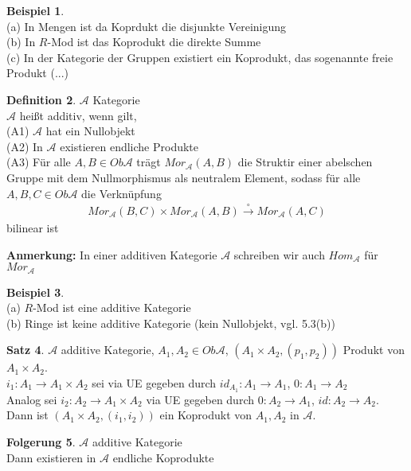 \documentclass[10pt,a4paper,numbers=endperiod]{scrreprt}
\theoremstyle{definition}
\newtheorem{satz}{Satz}[section]
\newtheorem{defi}[satz]{Definition}
\newtheorem{bsp}[satz]{Beispiel}
\newtheorem{folg}[satz]{Folgerung}
\begin{document}
\begin{bsp}
	$ $\\
	(a) In Mengen ist da Koprdukt die disjunkte Vereinigung\\
	(b) In $R$-Mod ist das Koprodukt die direkte Summe\\
	(c) In der Kategorie der Gruppen existiert ein Koprodukt, das sogenannte freie Produkt (...)
\end{bsp}

\begin{defi}
	$\mathcal{A}$ Kategorie\\
	$\mathcal{A}$ heißt additiv, wenn gilt,\\
	(A1) $\mathcal{A}$ hat ein Nullobjekt\\
	(A2) In $\mathcal{A}$ existieren endliche Produkte\\
	(A3) Für alle $A, B \in Ob \mathcal{A}$ trägt $Mor_\mathcal{A} (A, B)$ die Struktir einer abelschen Gruppe mit dem Nullmorphismus als neutralem Element, sodass für alle $A, B, C \in Ob \mathcal{A}$ die Verknüpfung \begin{align*}
		Mor_\mathcal{A} (B, C) \times Mor_\mathcal{A} (A, B) \overset{\circ}{\longrightarrow} Mor_\mathcal{A} (A, C)
	\end{align*}
	bilinear ist
\end{defi}

\textbf{Anmerkung:} In einer additiven Kategorie $\mathcal{A}$ schreiben wir auch $Hom_\mathcal{A}$ für $Mor_\mathcal{A}$

\begin{bsp}
	$ $\\
	(a) $R$-Mod ist eine additive Kategorie\\
	(b) Ringe ist keine additive Kategorie (kein Nullobjekt, vgl. 5.3(b))
\end{bsp}

\begin{satz}
	$\mathcal{A}$ additive Kategorie, $A_1, A_2 \in Ob \mathcal{A}$, $(A_1 \times A_2, (p_1, p_2))$ Produkt von $A_1 \times A_2$.\\
	$i_1: A_1 \to A_1 \times A_2$ sei via UE gegeben durch $id_{A_1}: A_1 \to A_1$, $0: A_1 \to A_2$\\
	Analog sei $i_2: A_2 \to A_1 \times A_2$ via UE gegeben durch $0: A_2 \to A_1$, $id:A_2 \to A_2$.\\
	Dann ist $(A_1 \times A_2, (i_1, i_2))$ ein Koprodukt von $A_1, A_2$ in $\mathcal{A}$.
\end{satz}

\begin{folg}
	$\mathcal{A}$ additive Kategorie\\
	Dann existieren in $\mathcal{A}$ endliche Koprodukte
\end{folg}
\end{document}
